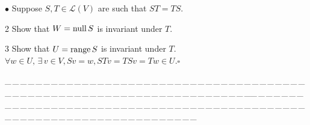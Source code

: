 \documentclass[a4paper, 11pt, UTF8]{article}
\def\range{\textup{range}\,}
\def\null{\textup{null\,}}
\def\Lm{\mathcal{L}}
\begin{document}
\begin{large}
{\small $\bullet$} {\timessl\Large 
Suppose $S,T\in\Lm(V)$ are such that $ST=TS.$}\par
{\timesbf\Large 2} {\timessl\Large Show that $W=\null S$ is invariant under $T$.}\par
{\timesbf\Large 3} {\timessl\Large Show that $U=\range S$ is invariant under $T$.}\,\,{$\forall w\in U,\,\exists\,v\in V,Sv=w, STv=TSv=Tw\in U.\square$}\par
{\tiny \_\,\_\,\_\,\_\,\_\,\_\,\_\,\_\,\_\,\_\,\_\,\_\,\_\,\_\,\_\,\_\,\_\,\_\,\_\,\_\,\_\,\_\,\_\,\_\,\_\,\_\,\_\,\_\,\_\,\_\,\_\,\_\,\_\,\_\,\_\,\_\,\_\,\_\,\_\,\_\,\_\,\_\,\_\,\_\,\_\,\_\,\_\,\_\,\_\,\_\,\_\,\_\,\_\,\_\,\_\,\_\,\_\,\_\,\_\,\_\,\_\,\_\,\_\,\_\,\_\,\_\,\_\,\_\,\_\,\_\,\_\_\,\_\,\_\,\_\,\_\,\_\,\_\,\_\,\_\,\_\,\_\,\_\,\_\,\_\,\_\,\_\,\_\,\_\,\_\,\_\,\_\,\_\,\_\,\_\,\_\,\_\,\_\,\_\,\_\,\_\,\_\,\_\,\_\,\_\,\_\,\_\,\_\,\_\,\_\,\_\,\_\,\_\,\_\,\_\,\_\,\_\,\_\,\_\,\_\,\_\,\_\,\_\,\_\,\_\,\_\,\_\,\_\,\_\,\_\,\_\,\_\,\_\,\_\,\_\,\_\,\_\,\_\,\_\,\_\,\_\,\_}\par


\end{large}
\end{document}
